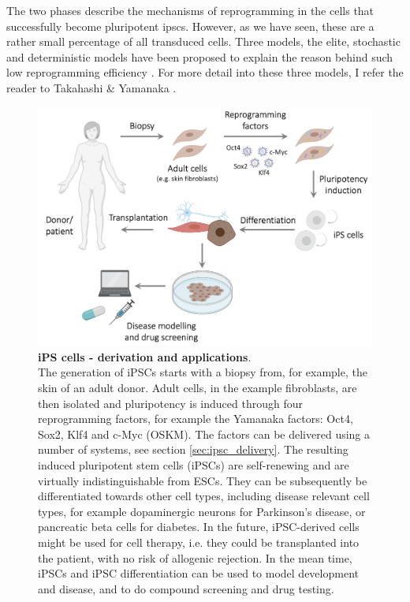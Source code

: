 The two phases describe the mechanisms of reprogramming in the cells that successfully become pluripotent \glspl{ipsc}.
However, as we have seen, these are a rather small percentage of all transduced cells.
Three models, the elite, stochastic and deterministic models have been proposed to explain the reason behind such low reprogramming efficiency \cite{omole2018ten}.
For more detail into these three models, I refer the reader to Takahashi \& Yamanaka \cite{takahashi2016decade}.

\begin{figure}[htbp]
\centering
\includegraphics[width=14cm]{Chapter1/Fig/ipscs.png}
\caption[iPS cells]{\textbf{iPS cells - derivation and applications}.\\
The generation of iPSCs starts with a biopsy from, for example, the skin of an adult donor.
Adult cells, in the example fibroblasts, are then isolated and pluripotency is induced through four reprogramming factors, for example the Yamanaka factors: Oct4, Sox2, Klf4 and c-Myc (OSKM).
The factors can be delivered using a number of systems, see section \ref{sec:ipsc_delivery}.
The resulting induced pluripotent stem cells (iPSCs) are self-renewing and are virtually indistinguishable from ESCs.
They can be subsequently be differentiated towards other cell types, including disease relevant cell types, for example dopaminergic neurons for Parkinson's disease, or pancreatic beta cells for diabetes.
In the future, iPSC-derived cells might be used for cell therapy, i.e. they could be transplanted into the patient, with no risk of allogenic rejection.
In the mean time, iPSCs and iPSC differentiation can be used to model development and disease, and to do compound screening and drug testing.}
\label{fig:ipsc}
\end{figure}

